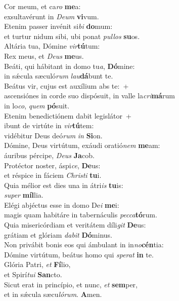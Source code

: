 \evenverse Cor meum, et ca\textit{ro} \textbf{me}a:~\*\\
\evenverse exsultavérunt in \textit{De}\textit{um} \textbf{vi}vum.\\
\oddverse Etenim passer invénit si\textit{bi} \textbf{do}mum:~\*\\
\oddverse et turtur nidum sibi, ubi ponat \textit{pul}\textit{los} \textbf{su}os.\\
\evenverse Altária tua, Dómine \textit{vir}\textbf{tú}tum:~\*\\
\evenverse Rex meus, et \textit{De}\textit{us} \textbf{me}us.\\
\oddverse Beáti, qui hábitant in domo tu\textit{a}, \textbf{Dó}mine:~\*\\
\oddverse in sǽcula sæculó\textit{rum} \textit{lau}\textbf{dá}bunt te.\\
\evenverse Beátus vir, cujus est auxílium abs te:~+\\
\evenverse  ascensiónes in corde suo dispósuit, in valle la\textit{cri}\textbf{má}rum~\*\\
\evenverse in lo\textit{co}, \textit{quem} \textbf{pó}suit.\\
\oddverse Etenim benedictiónem dabit legislátor~+\\
\oddverse  ibunt de virtúte in \textit{vir}\textbf{tú}tem:~\*\\
\oddverse vidébitur Deus deó\textit{rum} \textit{in} \textbf{Si}on.\\
\evenverse Dómine, Deus virtútum, exáudi oratió\textit{nem} \textbf{me}am:~\*\\
\evenverse áuribus pércipe, \textit{De}\textit{us} \textbf{Ja}cob.\\
\oddverse Protéctor noster, áspi\textit{ce}, \textbf{De}us:~\*\\
\oddverse et réspice in fáciem \textit{Chri}\textit{sti} \textbf{tu}i.\\
\evenverse Quia mélior est dies una in átri\textit{is} \textbf{tu}is:~\*\\
\evenverse \textit{su}\textit{per} \textbf{míl}lia.\\
\oddverse Elégi abjéctus esse in domo De\textit{i} \textbf{me}i:~\*\\
\oddverse magis quam habitáre in tabernáculis \textit{pec}\textit{ca}\textbf{tó}rum.\\
\evenverse Quia misericórdiam et veritátem díli\textit{git} \textbf{De}us:~\*\\
\evenverse grátiam et glóriam \textit{da}\textit{bit} \textbf{Dó}minus.\\
\oddverse Non privábit bonis eos qui ámbulant in in\textit{no}\textbf{cén}tia:~\*\\
\oddverse Dómine virtútum, beátus homo qui \textit{spe}\textit{rat} \textbf{in} te.\\
\evenverse Glória Patri, \textit{et} \textbf{Fí}lio,~\*\\
\evenverse et Spirí\textit{tu}\textit{i} \textbf{San}cto.\\
\oddverse Sicut erat in princípio, et nunc, \textit{et} \textbf{sem}per,~\*\\
\oddverse et in sǽcula sæcu\textit{ló}\textit{rum}. \textbf{A}men.\\
